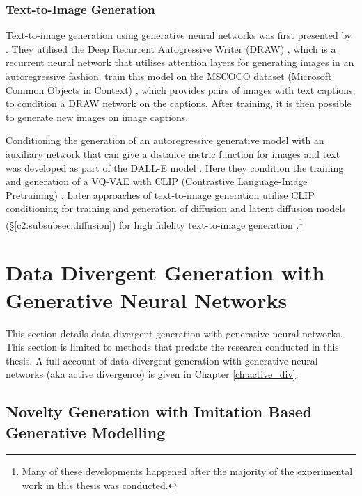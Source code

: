 \subsubsection{Text-to-Image Generation}

Text-to-image generation using generative neural networks was first presented by \cite{mansimov2015generating}.
They utilised the Deep Recurrent Autogressive Writer (DRAW) \citep{gregor2015draw}, which is a recurrent neural network that utilises attention layers for generating images in an autoregressive fashion.
\cite{mansimov2015generating} train this model on the MSCOCO dataset (Microsoft Common Objects in Context) \citep{lin2014microsoft}, which provides pairs of images with text captions, to condition a DRAW network on the captions.
After training, it is then possible to generate new images on image captions.

Conditioning the generation of an autoregressive generative model with an auxiliary network that can give a distance metric function for images and text was developed as part of the DALL-E model \citep{ramesh2021zero}.
Here they condition the training and generation of a VQ-VAE \citep{razavi2019generating} with CLIP (Contrastive Language-Image Pretraining) \citep{radford2021learning}.
Later approaches of text-to-image generation utilise CLIP conditioning for training and generation of diffusion and latent diffusion models (\S \ref{c2:subsubsec:diffusion}) for high fidelity text-to-image generation \citep{rombach2022high}.\footnote{Many of these developments happened after the majority of the experimental work in this thesis was conducted.}


\section{Data Divergent Generation with Generative Neural Networks}
\label{c2:sec:data-divergent}

This section details data-divergent generation with generative neural networks. 
This section is limited to methods that predate the research conducted in this thesis.
A full account of data-divergent generation with generative neural networks (aka active divergence) is given in Chapter \ref{ch:active_div}.

\subsection{Novelty Generation with Imitation Based Generative Modelling}

